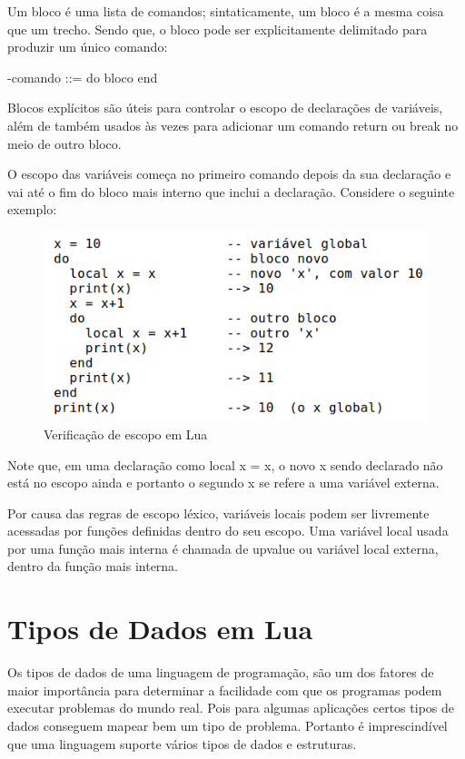 \documentclass[
12pt, %
openright, %
oneside, %
a4paper, %
english, %
brazil, %
]{abntex2}
\begin{document}
Um bloco é uma lista de comandos; sintaticamente, um bloco é a mesma coisa que um trecho. Sendo que, o bloco pode ser explicitamente delimitado para produzir um único comando:

-comando ::= do bloco end

Blocos explícitos são úteis para controlar o escopo de declarações de variáveis, além de também usados às vezes para adicionar um comando return ou break no meio de outro bloco.

O escopo das variáveis começa no primeiro comando depois da sua declaração e vai até o fim do bloco mais interno que inclui a declaração. Considere o seguinte exemplo:

\begin{figure}[H]
\centering
\includegraphics[width=0.5\linewidth]{imagens/imagem3.png}
\caption{Verificação de escopo em Lua}
\end{figure}

Note que, em uma declaração como local x = x, o novo x sendo declarado não está no escopo ainda e portanto o segundo x se refere a uma variável externa.

Por causa das regras de escopo léxico, variáveis locais podem ser livremente acessadas por funções definidas dentro do seu escopo. Uma variável local usada por uma função mais interna é chamada de upvalue ou variável local externa, dentro da função mais interna.


\chapter{Tipos de Dados em Lua}
Os tipos de dados de uma linguagem de programação, são um dos fatores de maior importância para determinar a facilidade com que os programas podem executar problemas do mundo real. Pois para algumas aplicações certos tipos de dados conseguem mapear bem um tipo de problema. Portanto é imprescindível que uma linguagem suporte vários tipos de dados e estruturas.
\end{document}
